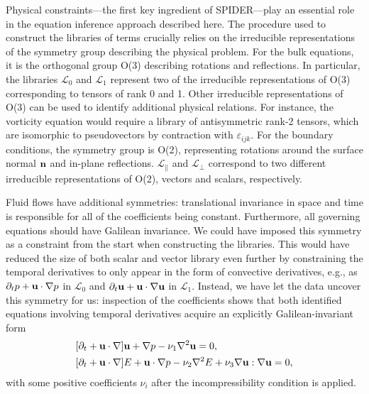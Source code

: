 \documentclass[preprint]{article}
\def\bi#1{\textbf{#1}}
\begin{document}
Physical constraints---the first key ingredient of SPIDER---play an essential role in the equation inference approach described here. The procedure used to construct the libraries of terms crucially relies on the irreducible representations of the symmetry group describing the physical problem. For the bulk equations, it is the orthogonal group O(3) describing rotations and reflections. In particular, the libraries $\mathcal{L}_0$ and $\mathcal{L}_1$ represent two of the irreducible representations of O(3)
corresponding to tensors of rank 0 and 1. Other irreducible representations of O(3) can be used to identify additional physical relations. For instance, the vorticity equation would require a library of antisymmetric rank-2 tensors, which are isomorphic to pseudovectors by contraction with $\varepsilon_{ijk}$. {For the boundary conditions, the symmetry group is O(2), representing rotations around the surface normal ${\bf n}$ and in-plane reflections. $\mathcal{L}_\parallel$ and $\mathcal{L}_\perp$ correspond to two different irreducible representations of O(2), vectors and scalars, respectively.}

Fluid flows have additional symmetries: translational invariance in space and time is responsible for all of the coefficients being constant. Furthermore, all governing equations should have Galilean invariance. We could have imposed this symmetry as a constraint from the start when constructing the libraries. This would have reduced the size of both scalar and vector library even further by constraining the temporal derivatives to only appear in the form of convective derivatives, e.g., as $\partial_tp+{\bf u}\cdot\nabla p$ in $\mathcal{L}_0$ and $\partial_t{\bf u}+{\bf u}\cdot\nabla{\bf u}$ in $\mathcal{L}_1$. Instead, we have let the data uncover this symmetry for us: inspection of the coefficients shows that both identified equations involving temporal derivatives acquire an explicitly Galilean-invariant form
\begin{align}
 &[\partial_t + {\bi u}\cdot \nabla]{\bi u} + \nabla p - \nu_1 \nabla^2 {\bi u}= 0, \nonumber\\%
 & [\partial_t+{\bf u}\cdot\nabla]E + {\bi u} \cdot \nabla p - \nu_2 \nabla^2E + \nu_3 \nabla {\bi u} : \nabla {\bi u} = 0, \label{eq:Galilean}
\end{align}
with some positive coefficients $\nu_i$ after the incompressibility condition is applied.
\end{document}

